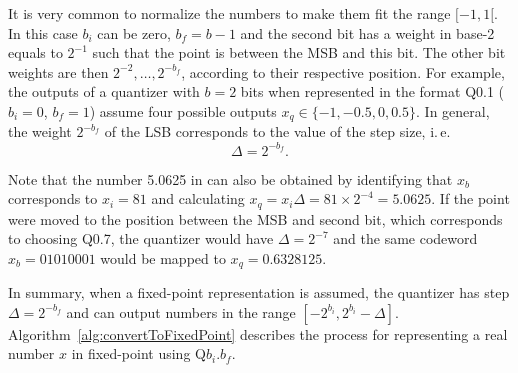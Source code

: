 It is very common to normalize the numbers to make them fit the range $[-1,1[$. In this case $b_i$ can be zero,  $b_f=b-1$ and the second bit has a weight in base-2 equals to $2^{-1}$ such that the point is between the MSB and this bit. The other bit weights are then $2^{-2}, \ldots, 2^{-b_f}$, according to their respective position.
For example, the outputs of a quantizer with $b=2$ bits when represented in the format Q0.1 ($b_i=0$, $b_f=1$) assume four possible outputs $x_q \in \{-1, -0.5, 0, 0.5\}$.
In general, the weight $2^{-b_f}$ of the LSB corresponds to the value of the step size, i.\,e.
\begin{equation}
\Delta = 2^{-b_f}.
\label{eq:deltaAsLSB}
\end{equation}

Note that the number 5.0625 in  can also be obtained by identifying that $x_b$ corresponds to $x_i=81$ and calculating $x_q = x_i \Delta = 81 \times 2^{-4} = 5.0625$.
If the point were moved to the position between the MSB and second bit, which corresponds to choosing Q0.7, the quantizer would have $\Delta = 2^{-7}$ and the same codeword $x_b=01010001$ would be mapped to $x_q=0.6328125$.

In summary, when a fixed-point representation is assumed, the quantizer has step $\Delta = 2^{-b_f}$ and can output numbers in the range $[-2^{b_i}, 2^{b_i} - \Delta]$.
Algorithm~\ref{alg:convertToFixedPoint} describes the process for representing a real number $x$ in fixed-point using Q$b_i$.$b_f$.


